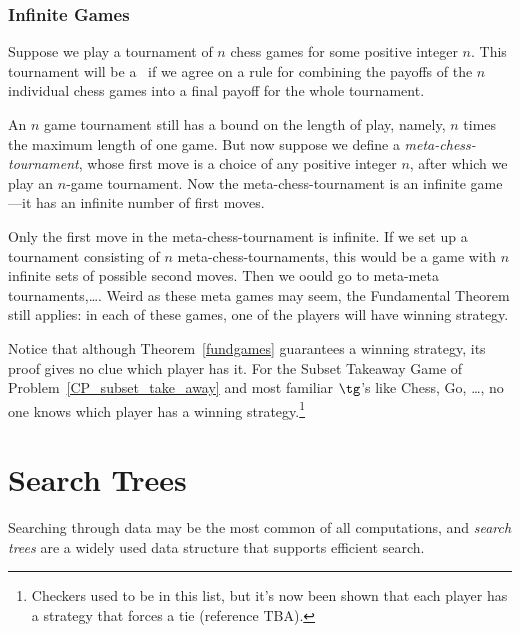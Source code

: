 \begin{definition}
\subsubsection{Infinite Games}

Suppose we play a tournament of $n$ chess games for some
positive integer $n$.  This tournament will be a \wnls\ if we agree on a
rule for combining the payoffs of the $n$ individual chess games into
a final payoff for the whole tournament.

An $n$ game tournament still has a bound on the length of play,
namely, $n$ times the maximum length of one game.  But now suppose we
define a \emph{meta-chess-tournament}, whose first move is a choice of
any positive integer $n$, after which we play an $n$-game tournament.
Now the meta-chess-tournament is an infinite game---it has an infinite
number of first moves.

Only the first move in the meta-chess-tournament is infinite.  If we
set up a tournament consisting of $n$ meta-chess-tournaments, this
would be a game with $n$ infinite sets of possible second moves.  Then
we oould go to meta-meta tournaments,\dots.  Weird as these meta games
may seem, the Fundamental Theorem still applies: in each of these
games, one of the players will have winning strategy.

Notice that although Theorem~\ref{fundgames} guarantees a winning
strategy, its proof gives no clue which player has it.  For the Subset
Takeaway Game of Problem~\ref{CP_subset_take_away} and most familiar
$\tg$'s like Chess, Go, \dots, no one knows which player has a winning
strategy.\footnote{Checkers used to be in this list, but it's now been
  shown that each player has a strategy that forces a tie (reference
  TBA).}

\begin{problems}
\practiceproblems
{}

\homeworkproblems
{}
\end{problems}

\section{Search Trees}\label{search_tree}

Searching through data may be the most common of all computations, and
\emph{search trees} are a widely used data structure that supports
efficient search.


\end{definition}

